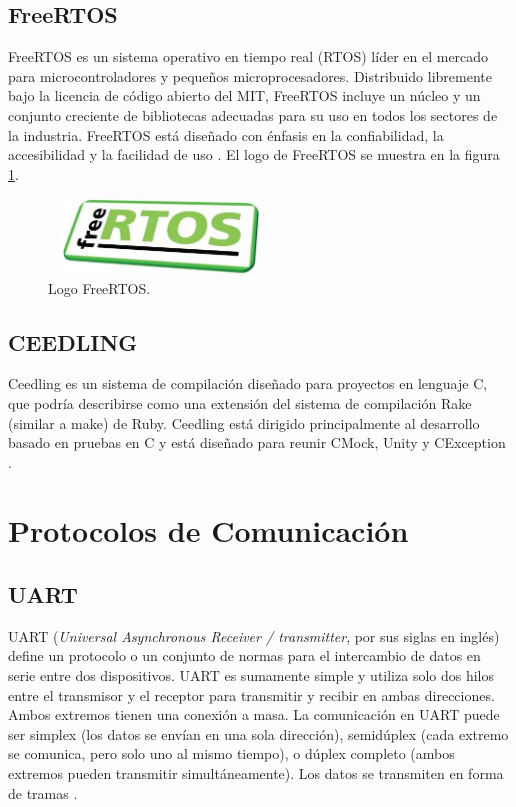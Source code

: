 \subsection{FreeRTOS}
\label{subsec:FreeRTOS}
FreeRTOS es un sistema operativo en tiempo real (RTOS) líder en el mercado para microcontroladores y pequeños microprocesadores. Distribuido libremente bajo la licencia de código abierto del MIT, FreeRTOS incluye un núcleo y un conjunto creciente de bibliotecas adecuadas para su uso en todos los sectores de la industria.
FreeRTOS está diseñado con énfasis en la confiabilidad, la accesibilidad y la facilidad de uso \citep{FreeRTOS}. El logo de FreeRTOS se muestra en la figura \ref{fig:FreeRTOS}.
\begin{figure}[htbp]
	\centering
	\includegraphics[width=6cm, height=2cm]{./Figures/logo_FreeRTOS.jpg}
	\caption{Logo FreeRTOS\protect\footnotemark.}
	\label{fig:FreeRTOS}
\end{figure}
\subsection{CEEDLING}
Ceedling es un sistema de compilación diseñado para proyectos en lenguaje C, que podría describirse como una extensión del sistema de compilación Rake (similar a make) de Ruby. Ceedling está dirigido principalmente al desarrollo basado en pruebas en C y está diseñado para reunir CMock, Unity y CException \citep{CEEDLING}.

\section{Protocolos de Comunicación}
\subsection{UART}
UART (\textit{Universal Asynchronous Receiver / transmitter}, por sus siglas en inglés) define un protocolo o un conjunto de normas para el intercambio de datos en serie entre dos dispositivos. UART es sumamente simple y utiliza solo dos hilos entre el transmisor y el receptor para transmitir y recibir en ambas direcciones. Ambos extremos tienen una conexión a masa. La comunicación en UART puede ser simplex (los datos se envían en una sola dirección), semidúplex (cada extremo se comunica, pero solo uno al mismo tiempo), o dúplex completo (ambos extremos pueden transmitir simultáneamente). Los datos se transmiten en forma de tramas \citep{UART}.
